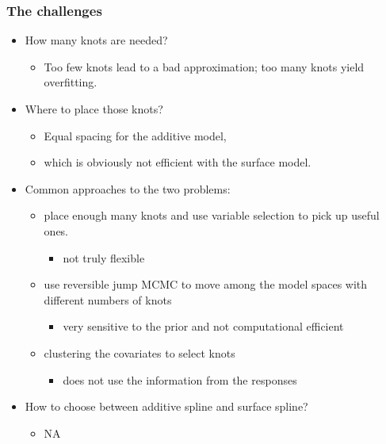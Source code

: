 \documentclass[10pt]{beamer}
\begin{document}
\begin{frame}
  \frametitle{The challenges}
  \begin{itemize}
  \item How many knots are needed?
    \begin{itemize}
    \item Too few knots lead to a bad approximation; too many knots yield
      overfitting.
    \end{itemize}
  \item Where to place those knots?
    \begin{itemize}
    \item Equal spacing for the additive model,
    \item which is obviously not efficient with the surface model.
    \end{itemize}
  \item Common approaches to the two problems:
    \begin{itemize}
    \item place enough many knots and use variable selection to pick up useful
      ones.
      \begin{itemize}
      \item not truly flexible
      \end{itemize}
    \item use reversible jump MCMC to move among the model spaces with different
      numbers of knots
      \begin{itemize}
      \item very sensitive to the prior and not computational efficient
      \end{itemize}
    \item clustering the covariates to select knots
      \begin{itemize}
      \item does not use the information from the responses
      \end{itemize}
    \end{itemize}
  \item How to choose between additive spline and surface spline?
    \begin{itemize}
    \item NA
    \end{itemize}
  \end{itemize}
\end{frame}
\end{document}
